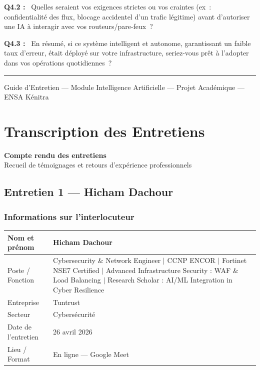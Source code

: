 \documentclass[12pt,a4paper]{report}
\newcommand{\og}{\guillemotleft\,}
\newcommand{\fg}{\,\guillemotright}
\begin{document}
\bigskip

\textbf{Q4.2 :} \og{} Quelles seraient vos exigences strictes ou vos craintes (ex~: confidentialit\'{e} des flux, blocage accidentel d'un trafic l\'{e}gitime) avant d'autoriser une IA \`{a} interagir avec vos routeurs/pare-feux~? \fg{}

\bigskip

\textbf{Q4.3 :} \og{} En r\'{e}sum\'{e}, si ce syst\`{e}me intelligent et autonome, garantissant un faible taux d'erreur, \'{e}tait d\'{e}ploy\'{e} sur votre infrastructure, seriez-vous pr\^{e}t \`{a} l'adopter dans vos op\'{e}rations quotidiennes~? \fg{}

\vspace{2em}
\noindent\rule{\linewidth}{0.4pt}
\begin{center}
  \small Guide d'Entretien --- Module Intelligence Artificielle --- Projet Acad\'{e}mique --- ENSA K\'{e}nitra
\end{center}

\clearpage

\chapter{Transcription des Entretiens}

\begin{center}
  {\Large\bfseries Compte rendu des entretiens}\\[0.4em]
  {\large Recueil de t\'{e}moignages et retours d'exp\'{e}rience professionnels}
\end{center}

\section{Entretien 1 --- Hicham Dachour}

\subsection*{Informations sur l'interlocuteur}

\begin{tabular}{@{}L{4cm} L{10.5cm}@{}}
  \hline
  Nom et pr\'{e}nom      & Hicham Dachour \\
  \hline
  Poste / Fonction   & Cybersecurity \& Network Engineer $|$ CCNP ENCOR $|$ Fortinet NSE7 Certified $|$ Advanced Infrastructure Security : WAF \& Load Balancing $|$ Research Scholar : AI/ML Integration in Cyber Resilience \\
  \hline
  Entreprise         & Tuntrust \\
  \hline
  Secteur            & Cybers\'{e}curit\'{e} \\
  \hline
  Date de l'entretien & 26 avril 2026 \\
  \hline
  Lieu / Format      & En ligne --- Google Meet \\
  \hline
\end{tabular}
\end{document}
